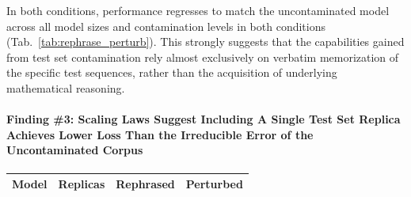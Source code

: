 In both conditions, performance regresses to match the uncontaminated model across all model sizes and contamination levels in both conditions (Tab.~\ref{tab:rephrase_perturb}).
This strongly suggests that the capabilities gained from test set contamination rely almost exclusively on verbatim memorization of the specific test sequences, rather than the acquisition of underlying mathematical reasoning.

\paragraph{Finding \#3: Scaling Laws Suggest Including A Single Test Set Replica Achieves Lower Loss Than the Irreducible Error of the Uncontaminated Corpus}

\begin{table}[t!]
    \centering
    \begin{tabular}{crrr}
        \toprule
        \textbf{Model} & \textbf{Replicas} & \textbf{Rephrased} & \textbf{Perturbed} \\
        \midrule

\end{tabular}
\end{table}
